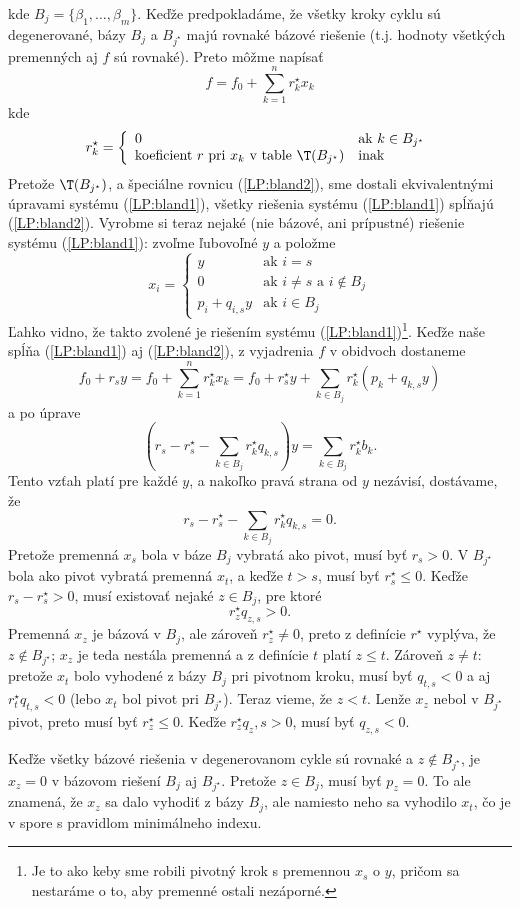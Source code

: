 \begin{dokaz}
\noindent
kde $B_j=\{\beta_1,\ldots,\beta_m\}$. 
Keďže predpokladáme, že všetky kroky cyklu sú degenerované, bázy $B_j$ a $B_{j^\star}$ majú rovnaké
bázové riešenie (t.j. hodnoty všetkých premenných aj $f$ sú rovnaké). Preto môžme napísať
\begin{equation}
  \label{LP:bland2}
  f = f_0 + \sum_{k=1}^nr^\star_kx_k
\end{equation}
kde
$$r^\star_k=\left\{\begin{array}{ll}0&\text{ak $k\in B_{j^\star}$}\\\text{koeficient $r$ pri $x_k$ v table $\T(B_{j^\star})$}&\text{inak}\end{array}\right.$$
%
Pretože $\T(B_{j^\star})$, a špeciálne rovnicu (\ref{LP:bland2}), sme dostali ekvivalentnými úpravami systému (\ref{LP:bland1}), všetky riešenia
systému  (\ref{LP:bland1}) spĺňajú (\ref{LP:bland2}). Vyrobme si teraz nejaké (nie bázové, ani prípustné) riešenie systému (\ref{LP:bland1}):
zvoľme ľubovoľné $y$ a položme
$$
x_i=\left\{\begin{array}{ll}%
    y&\text{ak $i=s$}\\
    0&\text{ak $i\not=s$ a $i\not\in B_j$}\\
    p_i+q_{i,s}y&\text{ak $i\in B_j$}
  \end{array}\right.
  $$
%
Ľahko vidno, že takto zvolené  je riešením systému  (\ref{LP:bland1})\footnote{Je to ako keby sme robili pivotný krok s premennou $x_s$ o $y$, 
pričom sa nestaráme o to, aby premenné ostali nezáporné.}.
Keďže naše  spĺňa (\ref{LP:bland1}) aj (\ref{LP:bland2}), z vyjadrenia $f$ v obidvoch dostaneme
$$
f_0 + r_sy = f_0 + \sum_{k=1}^nr^\star_kx_k = f_0 + r^\star_sy + \sum_{k\in B_j}r^\star_k(p_k+q_{k,s}y)
$$
a po úprave
$$
\left(r_s-r^\star_s-\sum_{k\in B_j}r^\star_kq_{k,s}\right)y=\sum_{k\in B_j}r^\star_kb_k
.$$
%
Tento vzťah platí pre každé $y$, a nakoľko pravá strana od $y$ nezávisí, dostávame, že
$$
r_s-r^\star_s-\sum_{k\in B_j}r^\star_kq_{k,s}=0
.$$
%
Pretože premenná $x_s$ bola v báze $B_j$ vybratá ako pivot, musí byť $r_s>0$. V $B_{j^\star}$ bola ako pivot vybratá premenná $x_t$, a keďže $t>s$, musí byť
$r^\star_s\le 0$. Keďže $r_s-r^\star_s>0$, musí existovať nejaké $z\in B_j$, pre ktoré
$$
r^\star_zq_{z,s}>0
.$$
Premenná $x_z$ je bázová v $B_j$, ale zároveň $r^\star_z\not=0$, preto z definície $r^\star$ vyplýva, že $z\not\in B_{j^\star}$; $x_z$ je teda nestála premenná a z definície
$t$ platí $z\le t$. Zároveň $z\not=t$: pretože $x_t$ bolo vyhodené z bázy $B_j$ pri pivotnom kroku, musí byť $q_{t,s}<0$ a aj $r^\star_tq_{t,s}<0$ (lebo $x_t$ bol pivot pri $B_{j^\star}$).
Teraz vieme, že $z<t$. Lenže $x_z$ nebol v $B_{j^\star}$ pivot, preto musí byť $r^\star_z\le0$. Keďže $r^\star_zq_z,s>0$, musí byť $q_{z,s}<0$.


\noindent
Keďže všetky bázové riešenia v degenerovanom cykle sú rovnaké a $z\not\in B_{j^\star}$, je $x_z=0$ v bázovom riešení $B_j$ aj $B_{j^\star}$. Pretože $z\in B_j$, musí byť $p_z=0$.
To ale znamená, že $x_z$ sa dalo vyhodiť z bázy $B_j$, ale namiesto neho sa vyhodilo $x_t$, čo je v spore s pravidlom minimálneho indexu.
\end{dokaz}

